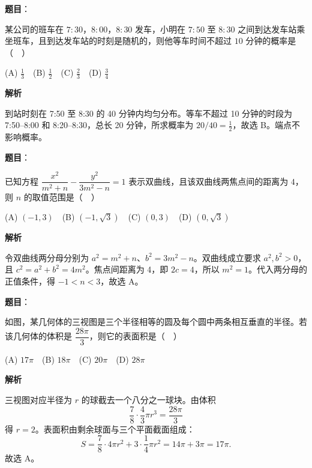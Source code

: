 \begin{answer}

\textbf{题目}：

某公司的班车在 $7{:}30$，$8{:}00$，$8{:}30$ 发车，小明在 $7{:}50$ 至 $8{:}30$ 之间到达发车站乘坐班车，且到达发车站的时刻是随机的，则他等车时间不超过 $10$ 分钟的概率是（　）

   (A) $\frac13$　(B) $\frac12$　(C) $\frac23$　(D) $\frac34$

\textbf{解析}

到站时刻在 7:50 至 8:30 的 40 分钟内均匀分布。等车不超过 10 分钟的时段为 7:50–8:00 和 8:20–8:30，总长 20 分钟，所求概率为 \(20/40=\frac12\)，故选 B。端点不影响概率。


\end{answer}
\begin{answer}

\textbf{题目}：

已知方程 $\dfrac{x^2}{m^2+n}-\dfrac{y^2}{3m^2-n}=1$ 表示双曲线，且该双曲线两焦点间的距离为 $4$，则 $n$ 的取值范围是（　）

   (A) $(-1,3)$　(B) $(-1,\sqrt3)$　(C) $(0,3)$　(D) $(0,\sqrt3)$

\textbf{解析}

令双曲线两分母分别为 \(a^2=m^2+n\)、\(b^2=3m^2-n\)。双曲线成立要求 \(a^2,b^2>0\)，且 \(c^2=a^2+b^2=4m^2\)。焦点间距离为 4，即 \(2c=4\)，所以 \(m^2=1\)。代入两分母的正值条件，得 \(-1<n<3\)，故选 A。


\end{answer}
\begin{answer}

\textbf{题目}：

如图，某几何体的三视图是三个半径相等的圆及每个圆中两条相互垂直的半径。若该几何体的体积是 $\dfrac{28\pi}{3}$，则它的表面积是（　）

   (A) $17\pi$　(B) $18\pi$　(C) $20\pi$　(D) $28\pi$
\nopagebreak[4]
\begin{center}\end{center}
\nopagebreak[4]
\textbf{解析}

三视图对应半径为 \(r\) 的球截去一个八分之一球块。由体积
\nopagebreak[4]
\[
\frac78\cdot\frac43\pi r^3=\frac{28\pi}{3}
\]
得 \(r=2\)。表面积由剩余球面与三个平面截面组成：
\nopagebreak[4]
\[
S=\frac78\cdot4\pi r^2+3\cdot\frac14\pi r^2
=14\pi+3\pi=17\pi.
\]
故选 A。


\end{answer}
